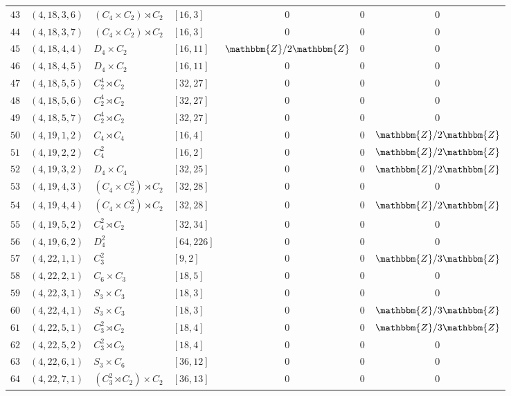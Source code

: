 \documentclass{amsart}
\theoremstyle{plain}
\theoremstyle{definition}
\theoremstyle{remark}
\newcommand{\bZ}{\mathbbm{Z}}\newcommand{\bQ}{\mathbbm{Q}}
\begin{document}
{\begin{longtable}{llll|ccc}
$43$ & $( 4, 18, 3, 6 )$ & $(C_4 \times C_2) \rtimes C_2$ & $[ 16, 3 ]$& $0$ & $0$ & $0$\\
$44$ & $( 4, 18, 3, 7 )$ & $(C_4 \times C_2) \rtimes C_2$ & $[ 16, 3 ]$& $0$ & $0$ & $0$\\
$45$ & $( 4, 18, 4, 4 )$ & $D_4\times C_2$ & $[ 16, 11 ]$& $\bZ/2\bZ$ & $0$ & $0$\\
$46$ & $( 4, 18, 4, 5 )$ & $D_4\times C_2$ & $[ 16, 11 ]$& $0$ & $0$ & $0$\\
$47$ & $( 4, 18, 5, 5 )$ & $C_2^4 \rtimes C_2$ & $[ 32, 27 ]$& $0$ & $0$ & $0$\\
$48$ & $( 4, 18, 5, 6 )$ & $C_2^4 \rtimes C_2$ & $[ 32, 27 ]$& $0$ & $0$ & $0$\\
$49$ & $( 4, 18, 5, 7 )$ & $C_2^4 \rtimes C_2$ & $[ 32, 27 ]$& $0$ & $0$ & $0$\\
$50$ & $( 4, 19, 1, 2 )$ & $C_4 \rtimes C_4$ & $[ 16, 4 ]$& $0$ & $0$ & $\bZ/2\bZ$\\
$51$ & $( 4, 19, 2, 2 )$ & $C_4^2$ & $[ 16, 2 ]$& $0$ & $0$ & $\bZ/2\bZ$\\
$52$ & $( 4, 19, 3, 2 )$ & $D_4 \times C_4$ & $[ 32, 25 ]$& $0$ & $0$ & $\bZ/2\bZ$\\
$53$ & $( 4, 19, 4, 3 )$ & $(C_4 \times C_2^2) \rtimes C_2$ & $[ 32, 28 ]$& $0$ & $0$ & $0$\\
$54$ & $( 4, 19, 4, 4 )$ & $(C_4 \times C_2^2) \rtimes C_2$ & $[ 32, 28 ]$& $0$ & $0$ & $\bZ/2\bZ$\\
$55$ & $( 4, 19, 5, 2 )$ & $C_4^2 \rtimes C_2$ & $[ 32, 34 ]$& $0$ & $0$ & $0$\\
$56$ & $( 4, 19, 6, 2 )$ & $D_4^2$ & $[ 64, 226 ]$& $0$ & $0$ & $0$\\
$57$ & $( 4, 22, 1, 1 )$ & $C_3^2$ & $[ 9, 2 ]$& $0$ & $0$ & $\bZ/3\bZ$\\
$58$ & $( 4, 22, 2, 1 )$ & $C_6 \times C_3$ & $[ 18, 5 ]$& $0$ & $0$ & $0$\\
$59$ & $( 4, 22, 3, 1 )$ & $S_3 \times C_3$ & $[ 18, 3 ]$& $0$ & $0$ & $0$\\
$60$ & $( 4, 22, 4, 1 )$ & $S_3 \times C_3$ & $[ 18, 3 ]$& $0$ & $0$ & $\bZ/3\bZ$\\
$61$ & $( 4, 22, 5, 1 )$ & $C_3^2 \rtimes C_2$ & $[ 18, 4 ]$& $0$ & $0$ & $\bZ/3\bZ$\\
$62$ & $( 4, 22, 5, 2 )$ & $C_3^2 \rtimes C_2$ & $[ 18, 4 ]$& $0$ & $0$ & $0$\\
$63$ & $( 4, 22, 6, 1 )$ & $S_3 \times C_6$ & $[ 36, 12 ]$& $0$ & $0$ & $0$\\
$64$ & $( 4, 22, 7, 1 )$ & $(C_3^2 \rtimes C_2) \times C_2$ & $[ 36, 13 ]$& $0$ & $0$ & $0$\\

\end{longtable}}
\end{document}
